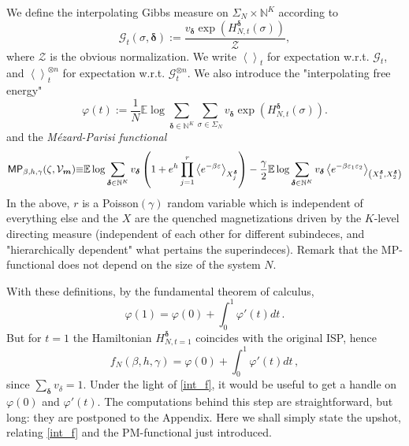 \documentclass[a4paper,12pt,oneside,reqno]{amsart}
\numberwithin{equation}{section}
\begin{document}
We define the interpolating Gibbs measure on $\Sigma_N \times {\mathbb{N}}^K$ according to 
\[
 \mathcal{G}_t(\sigma,\boldsymbol \delta) :=  \frac{ v_{\boldsymbol \delta} \exp\left(H^{\boldsymbol \delta}_{N,t}(\sigma)\right)}{\mathcal Z},
\]
where $\mathcal Z$ is the obvious normalization. We write $\left<\right>_{t}$ for expectation w.r.t. $\mathcal{G}_t$, and $\left<\right>_{t}^{\otimes n}$  for expectation w.r.t. $\mathcal{G}_t^{\otimes n}$. We also introduce the "interpolating free energy" 
\[
\varphi(t):= \frac{1}{N}{{\mathbb{E}}} \log \sum\limits_{\boldsymbol{\delta}\in {\mathbb{N}}^K}\sum\limits_{\sigma \in \Sigma_N} v_{\boldsymbol{\delta}} \exp\left(H^{\boldsymbol{\delta}}_{N,t}(\sigma)\right).
\]
and the {\it M\'{e}zard-Parisi functional}
\[
\text{\sf MP}_{{\beta}, h, \gamma}(\zeta, \mathcal V_{\boldsymbol m}) {\equiv} 
{{\mathbb{E}}} \log \sum\limits_{\boldsymbol \delta\in {\mathbb{N}}^K} v_{\boldsymbol \delta} \left(1+ e^h \prod\limits_{j=1}^r\left<e^{-\beta \varepsilon}\right>_{X^{\boldsymbol \delta}_{j}}\right) - \frac{\gamma}{2}{{\mathbb{E}}} \log \sum\limits_{\boldsymbol \delta \in {\mathbb{N}}^K} v_{\boldsymbol \delta }  \left<e^{-\beta\varepsilon_1\varepsilon_2}\right>_{\left(X^{\boldsymbol \delta}_1,X^{\boldsymbol \delta}_2\right)} 
\]
In the above, $r$ is a Poisson$(\gamma)$ random variable which is independent of everything else and the $X$ are the quenched magnetizations driven by the $K$-level directing measure (independent of each other for different subindeces, and "hierarchically dependent" what pertains the superindeces). Remark that the MP-functional does not depend on the size of the system $N$.

With these definitions, by the fundamental theorem of calculus,
\[
\varphi(1) = \varphi(0) + \int_0^1 \varphi'(t) dt\,.
\]
But for $t=1$ the Hamiltonian $H^{\boldsymbol \delta}_{N, t= 1}$ coincides with the original ISP, hence
 \begin{equation} \label{int_f}
f_N({\beta}, h, \gamma) = \varphi(0) + \int_0^1 \varphi'(t) dt\,,
\end{equation}
since $\sum_{\boldsymbol {\delta}} v_{\delta}  = 1$. Under the light of \eqref{int_f}, it would be useful to get a handle on $\varphi(0)$ and $\varphi'(t)$. The computations behind this step are straightforward, but long: they are postponed to the Appendix. Here we shall simply state the upshot, relating \eqref{int_f} and the PM-functional just introduced. 
\end{document}
